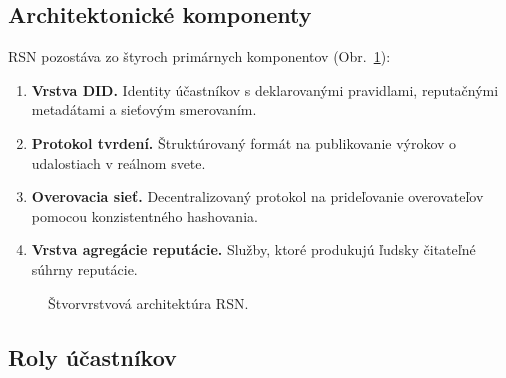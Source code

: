 \documentclass[11pt,a4paper,twocolumn]{article}
\begin{document}
\subsection{Architektonické komponenty}

RSN pozostáva zo štyroch primárnych komponentov (Obr.~\ref{fig:architecture}):
\begin{enumerate}[nosep]
\item \textbf{Vrstva DID.} Identity účastníkov s deklarovanými pravidlami, reputačnými metadátami a sieťovým smerovaním.
\item \textbf{Protokol tvrdení.} Štruktúrovaný formát na publikovanie výrokov o udalostiach v reálnom svete.
\item \textbf{Overovacia sieť.} Decentralizovaný protokol na prideľovanie overovateľov pomocou konzistentného hashovania.
\item \textbf{Vrstva agregácie reputácie.} Služby, ktoré produkujú ľudsky čitateľné súhrny reputácie.
\end{enumerate}

\begin{figure}[ht]
\centering
{}
\caption{Štvorvrstvová architektúra RSN.}
\label{fig:architecture}
\end{figure}

\subsection{Roly účastníkov}
\end{document}
